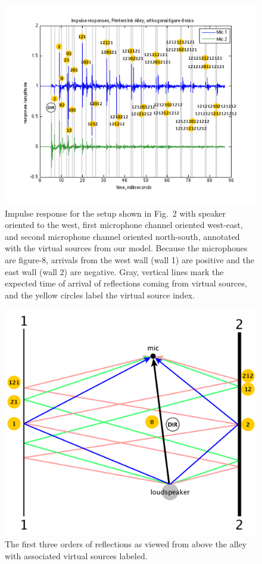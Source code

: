 \documentclass{aes137}
\begin{document}
\begin{figure}[h!] \centering \includegraphics[width=\linewidth]{images/annotated_reflections_v2.pdf} 
\caption{Impulse response for the setup shown in Fig.~2 with speaker
  oriented to the west, first microphone channel oriented west-east, and second microphone channel oriented north-south, annotated with the virtual sources from our
  model. Because the microphones are figure-8, arrivals from the west wall (wall 1) are positive
and the east wall (wall 2) are negative. Gray, vertical lines mark the expected time of arrival of
  reflections coming from virtual sources, and the yellow circles
  label the virtual source index.} %
\end{figure}

\begin{figure}[h!] \centering \includegraphics[width=0.7\linewidth]{images/planview_paths_v2.pdf} 
\caption{The first three orders of reflections as viewed from above the alley with associated virtual sources labeled.} 
\end{figure}
\end{document}
